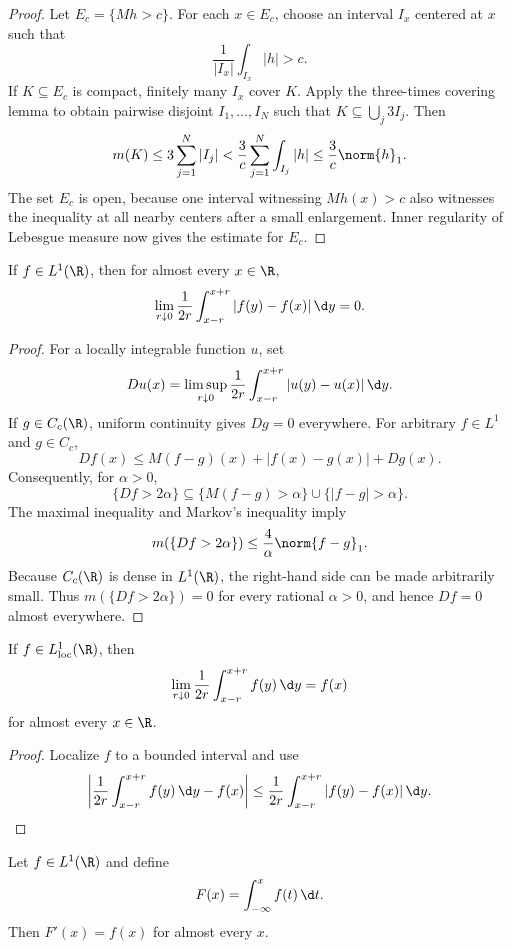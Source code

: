 \begin{proof}
Let $E_c=\{Mh>c\}$. For each $x\in E_c$, choose an interval $I_x$ centered at $x$ such that
\[
\frac1{|I_x|}\int_{I_x}|h|>c.
\]
If $K\subseteq E_c$ is compact, finitely many $I_x$ cover $K$. Apply the three-times covering lemma to obtain pairwise disjoint $I_1,\dots,I_N$ such that $K\subseteq\bigcup_j3I_j$. Then
\[
m(K)\leq 3\sum_{j=1}^N|I_j|
 <\frac3c\sum_{j=1}^N\int_{I_j}|h|
 \leq \frac3c\norm{h}_1.
\]
The set $E_c$ is open, because one interval witnessing $Mh(x)>c$ also witnesses the inequality at all nearby centers after a small enlargement. Inner regularity of Lebesgue measure now gives the estimate for $E_c$.
\end{proof}

\begin{thm}
If $f\in L^1(\R)$, then for almost every $x\in\R$,
\[
\lim_{r\downarrow0}\frac1{2r}\int_{x-r}^{x+r}|f(y)-f(x)|\,\d y=0.
\]
\end{thm}

\begin{proof}
For a locally integrable function $u$, set
\[
Du(x)=\limsup_{r\downarrow0}\frac1{2r}\int_{x-r}^{x+r}|u(y)-u(x)|\,\d y.
\]
If $g\in C_c(\R)$, uniform continuity gives $Dg=0$ everywhere. For arbitrary $f\in L^1$ and $g\in C_c$,
\[
Df(x)\leq M(f-g)(x)+|f(x)-g(x)|+Dg(x).
\]
Consequently, for $\alpha>0$,
\[
\{Df>2\alpha\}
 \subseteq \{M(f-g)>\alpha\}\cup\{|f-g|>\alpha\}.
\]
The maximal inequality and Markov's inequality imply
\[
m(\{Df>2\alpha\})\leq \frac4\alpha\norm{f-g}_1.
\]
Because $C_c(\R)$ is dense in $L^1(\R)$, the right-hand side can be made arbitrarily small. Thus $m(\{Df>2\alpha\})=0$ for every rational $\alpha>0$, and hence $Df=0$ almost everywhere.
\end{proof}

\begin{cor}
If $f\in L^1_{\loc}(\R)$, then
\[
\lim_{r\downarrow0}\frac1{2r}\int_{x-r}^{x+r}f(y)\,\d y=f(x)
\]
for almost every $x\in\R$.
\end{cor}

\begin{proof}
Localize $f$ to a bounded interval and use
\[
\left|\frac1{2r}\int_{x-r}^{x+r}f(y)\,\d y-f(x)\right|
\leq \frac1{2r}\int_{x-r}^{x+r}|f(y)-f(x)|\,\d y.
\]
\end{proof}

\begin{cor}
Let $f\in L^1(\R)$ and define
\[
F(x)=\int_{-\infty}^x f(t)\,\d t.
\]
Then $F'(x)=f(x)$ for almost every $x$.
\end{cor}

